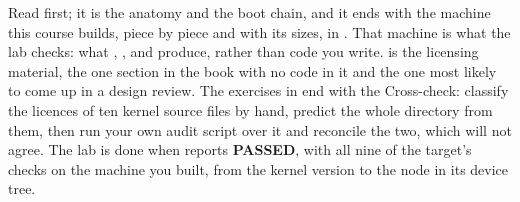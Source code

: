 Read  first; it is the anatomy and the boot chain, and it ends with the machine
this course builds, piece by piece and with its sizes, in . That machine is
what the lab checks: what , ,  and
 produce, rather than code you write.  is the
licensing material, the one section in the book with no code in it and the one most likely to come
up in a design review. The exercises in  end with the Cross-check: classify
the licences of ten kernel source files by hand, predict the whole directory from them, then run
your own audit script over it and reconcile the two, which will not agree. The lab is done when
 reports \textbf{PASSED}, with all nine of the target's checks on the machine
you built, from the kernel version to the  node in its device tree.





